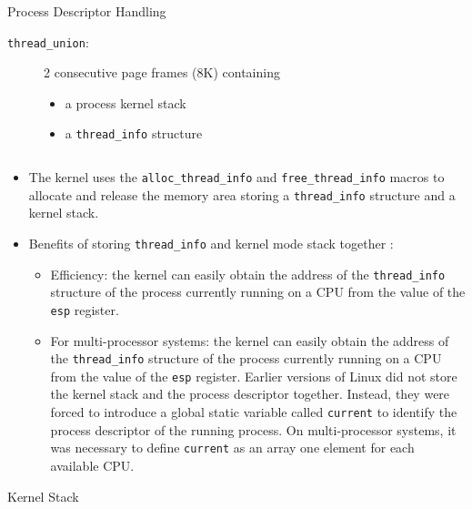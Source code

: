 \begin{frame}[fragile=singleslide]{Process Descriptor Handling}
  \begin{description}
  \item[\texttt{thread\_union}:] 2 consecutive page frames (8K) containing
    \begin{itemize}
    \item a process kernel stack
    \item a \texttt{thread\_info} structure
    \end{itemize}
  \end{description}
  \begin{minipage}{.8\textwidth}
    \inputminted{c}{../figs/thread_union.c}
  \end{minipage}
\end{frame}

\begin{itemize}
\item The kernel uses the \texttt{alloc\_thread\_info} and \texttt{free\_thread\_info} macros
  to allocate and release the memory area storing a \texttt{thread\_info} structure and a
  kernel stack.
\item Benefits of storing \texttt{thread\_info} and kernel mode stack together :
  \begin{itemize}
  \item Efficiency: the kernel can easily obtain the address of the \texttt{thread\_info}
    structure of the process currently running on a CPU from the value of the \texttt{esp}
    register.
  \item For multi-processor systems: the kernel can easily obtain the address of the
    \texttt{thread\_info} structure of the process currently running on a CPU from the value
    of the \texttt{esp} register. Earlier versions of Linux did not store the kernel stack and the
    process descriptor together. Instead, they were forced to introduce a global static
    variable called \texttt{current} to identify the process descriptor of the running
    process. On multi-processor systems, it was necessary to define \texttt{current} as an
    array one element for each available CPU.
  \end{itemize}
\end{itemize}

\begin{frame}{Kernel Stack}
  \begin{center}
  \end{center}
\end{frame}

